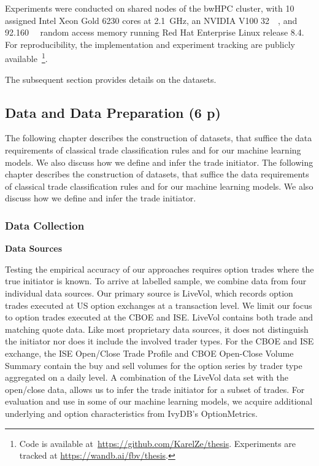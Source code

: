 Experiments were conducted on shared nodes of the bwHPC cluster, with 10 assigned Intel Xeon Gold 6230 cores at \SI{2.1}{\GHz}, an NVIDIA V100 \SI{32}{\giga\byte}, and \SI{92.160}{\giga\byte} random access memory running Red Hat Enterprise Linux release 8.4. For reproducibility, the implementation and experiment tracking are publicly available~\footnote{Code is available at~\url{https://github.com/KarelZe/thesis}. Experiments are tracked at \url{https://wandb.ai/fbv/thesis}.}.

The subsequent section provides details on the datasets.

\subsection{Data and Data Preparation (6 p)}\label{sec:data-and-data-preparation}

The following chapter describes the construction of datasets, that suffice the data requirements of classical trade classification rules and for our machine learning models. We also discuss how we define and infer the trade initiator.
The following chapter describes the construction of datasets, that suffice the data requirements of classical trade classification rules and for our machine learning models. We also discuss how we define and infer the trade initiator.

\subsubsection{Data Collection}\label{sec:data-collection}

\textbf{Data Sources}

Testing the empirical accuracy of our approaches requires option trades where the true initiator is known. To arrive at labelled sample, we combine data from four individual data sources. Our primary source is LiveVol, which records option trades executed at US option exchanges at a transaction level. We limit our focus to option trades executed at the \gls{CBOE} and \gls{ISE}. LiveVol contains both trade and matching quote data. Like most proprietary data sources, it does not distinguish the initiator nor does it include the involved trader types. For the \gls{CBOE} and \gls{ISE} exchange, the \gls{ISE} Open/Close Trade Profile and \gls{CBOE} Open-Close Volume Summary contain the buy and sell volumes for the option series by trader type aggregated on a daily level. A combination of the LiveVol data set with the open/close data, allows us to infer the trade initiator for a subset of trades. For evaluation and use in some of our machine learning models, we acquire additional underlying and option characteristics from IvyDB's OptionMetrics.

